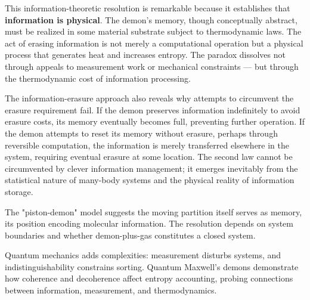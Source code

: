 This information-theoretic resolution is remarkable because it establishes that \textbf{information is physical}. The demon's memory, though conceptually abstract, must be realized in some material substrate subject to thermodynamic laws. The act of erasing information is not merely a computational operation but a physical process that generates heat and increases entropy. The paradox dissolves not through appeals to measurement work or mechanical constraints — but through the thermodynamic cost of information processing.

The information-erasure approach also reveals why attempts to circumvent the erasure requirement fail. If the demon preserves information indefinitely to avoid erasure costs, its memory eventually becomes full, preventing further operation. If the demon attempts to reset its memory without erasure, perhaps through reversible computation, the information is merely transferred elsewhere in the system, requiring eventual erasure at some location. The second law cannot be circumvented by clever information management; it emerges inevitably from the statistical nature of many-body systems and the physical reality of information storage.

The "piston-demon" model suggests the moving partition itself serves as memory, its position encoding molecular information. The resolution depends on system boundaries and whether demon-plus-gas constitutes a closed system.

Quantum mechanics adds complexities: measurement disturbs systems, and indistinguishability constrains sorting. Quantum Maxwell's demons demonstrate how coherence and decoherence affect entropy accounting, probing connections between information, measurement, and thermodynamics.